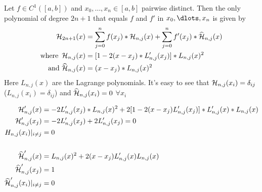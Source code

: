 \begin{theorem}
    Let $f \in C^1([a,b])$ and $x_0, \ldots, x_n \in [a,b]$ pairwise distinct.
    Then the only polynomial of degree $2n+1$ that equals $f$ and $f'$ in $x_0, \dlots, x_n$ is given by
    \begin{align*}
        \operatorname{\mathcal{H}}_{2n+1}(x) &= \sum_{j=0}^{n} f(x_j) * \operatorname{\mathcal{H}}_{n,j}(x) + \sum_{j=0}^{n} f'(x_j) * \widehat{\operatorname{\mathcal{H}}}_{n,j}(x)\\
        \text{where } \operatorname{\mathcal{H}}_{n,j}(x) &= [1-2(x-x_j) * L'_{n,j}(x_j)]*L_{n,j}(x)^2\\
        \text{and } \widehat{\operatorname{\mathcal{H}}}_{n,j}(x) &= (x-x_j)*L_{n,j}(x)^2
    \end{align*}
    Here $L_{n,j}(x)$ are the Lagrange polynomials.
    It's easy to see that $\operatorname{\mathcal{H}}_{n,j}(x_i) = \delta_{ij}$ ($L_{n,j}(x_i) = \delta_{ij}$)
    and $\widehat{\operatorname{\mathcal{H}}}_{n,j}(x_i) = 0$ $\forall x_i$

    \begin{align*}
        \operatorname{\mathcal{H}}_{n,j}'(x) &= -2 L'_{n,j}(x_j)*L_{n,j}(x)^2 + 2[1-2(x-x_j)L_{n,j}'(x_j)]*L_{n,j}'(x)*L_{n,j}(x)\\
        \operatorname{\mathcal{H}}_{n,j}'(x_j) &= -2L_{n,j}'(x_j)+2L_{n,j}'(x_j) = 0\\
        H_{n,j}(x_i) |_{i \neq j} &= 0\\
        \\
        \widehat{\operatorname{\mathcal{H}}}_{n,j}'(x)&=L_{n,j}(x)^2+2(x-x_j)L_{n,j}'(x)L_{n,j}(x)\\
        \widehat{\operatorname{\mathcal{H}}}_{n,j}'(x_j)&= 1\\
        \widehat{\operatorname{\mathcal{H}}}_{n,j}'(x_i) |_{i \neq j} &= 0
    \end{align*}
\end{theorem}

